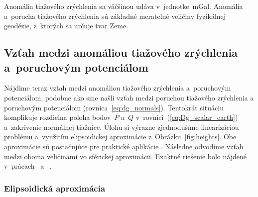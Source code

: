 \documentclass[a4paper,12pt]{book}
\begin{document}
Anomália tiažového zrýchlenia sa väčšinou udáva v~jednotke~mGal.  Anomália 
a~porucha tiažového zrýchlenia sú základné merateľné veličiny fyzikálnej 
geodézie, z~ktorých sa určuje tvar Zeme.

\subsection{Vzťah medzi anomáliou tiažového zrýchlenia a~poruchovým 
potenciálom}

Nájdime teraz vzťah medzi anomáliou tiažového zrýchlenia a~poruchovým 
potenciálom, podobne ako sme našli vzťah medzi poruchou tiažového zrýchlenia 
a poruchovým potenciálom (rovnica~\ref{eq:dg_normals}).  Tentokrát situáciu 
komplikuje rozdielna poloha bodov~$P$ a~$Q$ 
v~rovnici~(\ref{eq:Dg_scalar_earth}) a~zakrivenie normálnej tiažnice.  Úlohu si 
výrazne zjednodušíme linearizáciou problému a~využitím elipsoidickej 
aproximácie z~Obrázku~\ref{fig:heights}.  Obe aproximácie sú postačujúce pre 
praktické aplikácie \parencite{MoritzAdvancedGeodesy}.  Následne odvodíme vzťah 
medzi oboma veličinami vo sférickej aproximácii.  Exaktné riešenie bolo nájdené 
v~prácach~\textcite{Meissl1971b} a~\textcite{Borre_chapter8} \parencite[pozri 
tiež napríklad][]{MoritzAdvancedGeodesy,Janak2006}.

\subsubsection{Elipsoidická aproximácia}
\end{document}
